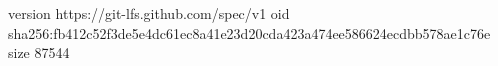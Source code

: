 version https://git-lfs.github.com/spec/v1
oid sha256:fb412c52f3de5e4dc61ec8a41e23d20cda423a474ee586624ecdbb578ae1c76e
size 87544
